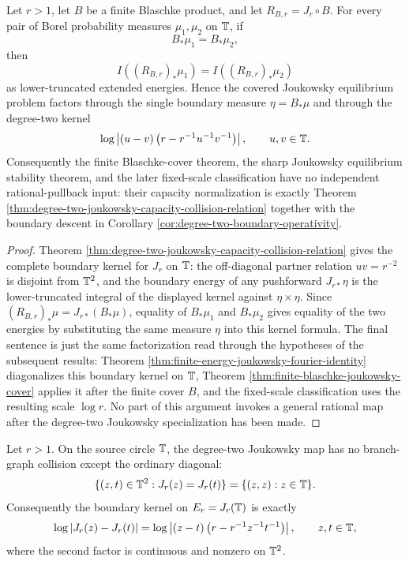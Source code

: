 \begin{corollary}\label{cor:primary-joukowsky-capacity-chain}
Let \(r>1\), let \(B\) be a finite Blaschke product, and let \(R_{B,r}=J_r\circ B\).  For every pair of Borel probability measures \(\mu_1,\mu_2\) on \(\mathbb{T}\), if
\[
B_\ast\mu_1=B_\ast\mu_2,
\]
then
\[
I((R_{B,r})_\ast\mu_1)=I((R_{B,r})_\ast\mu_2)
\]
as lower-truncated extended energies.  Hence the covered Joukowsky equilibrium problem factors through the single boundary measure \(\eta=B_\ast\mu\) and through the degree-two kernel
\[
\log\left|(u-v)\left(r-r^{-1}u^{-1}v^{-1}\right)\right|,
\qquad u,v\in\mathbb{T}.
\]
Consequently the finite Blaschke-cover theorem, the sharp Joukowsky equilibrium stability theorem, and the later fixed-scale classification have no independent rational-pullback input: their capacity normalization is exactly Theorem \ref{thm:degree-two-joukowsky-capacity-collision-relation} together with the boundary descent in Corollary \ref{cor:degree-two-boundary-operativity}.
\end{corollary}

\begin{proof}
Theorem \ref{thm:degree-two-joukowsky-capacity-collision-relation} gives the complete boundary kernel for \(J_r\) on \(\mathbb{T}\): the off-diagonal partner relation \(uv=r^{-2}\) is disjoint from \(\mathbb{T}^2\), and the boundary energy of any pushforward \(J_{r\ast}\eta\) is the lower-truncated integral of the displayed kernel against \(\eta\times\eta\).  Since \((R_{B,r})_\ast\mu=J_{r\ast}(B_\ast\mu)\), equality of \(B_\ast\mu_1\) and \(B_\ast\mu_2\) gives equality of the two energies by substituting the same measure \(\eta\) into this kernel formula.  The final sentence is just the same factorization read through the hypotheses of the subsequent results: Theorem \ref{thm:finite-energy-joukowsky-fourier-identity} diagonalizes this boundary kernel on \(\mathbb{T}\), Theorem \ref{thm:finite-blaschke-joukowsky-cover} applies it after the finite cover \(B\), and the fixed-scale classification uses the resulting scale \(\log r\).  No part of this argument invokes a general rational map after the degree-two Joukowsky specialization has been made.
\end{proof}

\begin{corollary}\label{cor:degree-two-boundary-operativity}
Let \(r>1\).  On the source circle \(\mathbb{T}\), the degree-two Joukowsky map has no branch-graph collision except the ordinary diagonal:
\[
\{(z,t)\in\mathbb{T}^2:J_r(z)=J_r(t)\}=\{(z,z):z\in\mathbb{T}\}.
\]
Consequently the boundary kernel on \(E_r=J_r(\mathbb{T})\) is exactly
\[
\log|J_r(z)-J_r(t)|=
\log\left|(z-t)\left(r-r^{-1}z^{-1}t^{-1}\right)\right|,
\qquad z,t\in\mathbb{T},
\]
where the second factor is continuous and nonzero on \(\mathbb{T}^2\).
\end{corollary}

